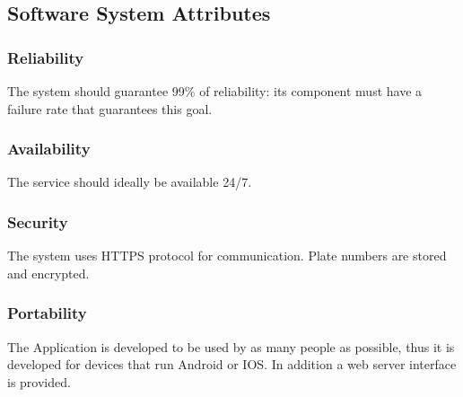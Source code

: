 \subsection{Software System Attributes}

\subsubsection{Reliability}

The system should guarantee 99\% of reliability: 
its component must have a failure rate that 
guarantees this goal.

\subsubsection{Availability}

The service should ideally be available 24/7.

\subsubsection{Security}

The system uses HTTPS protocol for communication. Plate numbers are 
stored and encrypted.

\subsubsection{Portability}

The Application is developed to be used by as many people as possible, 
thus it is developed for devices that run Android or IOS. In addition a web server interface is provided.